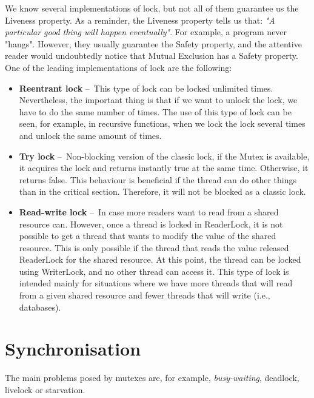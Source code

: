 We know several implementations of lock, but not all of them guarantee us the Liveness property. As a reminder, the Liveness property tells us that: \emph{"A particular good thing will happen eventually"}. For example, a program never "hangs". However, they usually guarantee the Safety property, and the attentive reader would undoubtedly notice that Mutual Exclusion has a Safety property. One of the leading implementations of lock are the following:
\begin {itemize}
    \item \textbf{Reentrant lock} \---\ This type of lock can be locked unlimited times. Nevertheless, the important thing is that if we want to unlock the lock, we have to do the same number of times. The use of this type of lock can be seen, for example, in recursive functions, when we lock the lock several times and unlock the same amount of times.
    \item \textbf{Try lock} \---\ Non-blocking version of the classic lock, if the Mutex is available, it acquires the lock and returns instantly true at the same time. Otherwise, it returns false. This behaviour is beneficial if the thread can do other things than in the critical section. Therefore, it will not be blocked as a classic lock.
    \item \textbf{Read-write lock} \---\ In case more readers want to read from a shared resource can. However, once a thread is locked in ReaderLock, it is not possible to get a thread that wants to modify the value of the shared resource. This is only possible if the thread that reads the value released ReaderLock for the shared resource. At this point, the thread can be locked using WriterLock, and no other thread can access it. This type of lock is intended mainly for situations where we have more threads that will read from a given shared resource and fewer threads that will write (i.e., databases).
\end{itemize}

\section{Synchronisation}
\label{04:synchronization}

The main problems posed by mutexes are, for example, \emph {busy-waiting}, deadlock, livelock or starvation.

